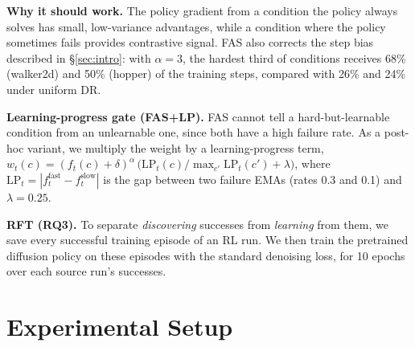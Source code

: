 \documentclass{article}
\newcommand{\fas}{\textsc{FAS}}
\begin{document}
\textbf{Why it should work.} The policy gradient from a condition the policy always solves has small, low-variance advantages, while a condition where the policy sometimes fails provides contrastive signal.
\fas{} also corrects the step bias described in \S\ref{sec:intro}: with $\alpha=3$, the hardest third of conditions receives 68\% (walker2d) and 50\% (hopper) of the training steps, compared with 26\% and 24\% under uniform DR.

\textbf{Learning-progress gate (\fas{}+LP).} \fas{} cannot tell a hard-but-learnable condition from an unlearnable one, since both have a high failure rate.
As a post-hoc variant, we multiply the weight by a learning-progress term, $w_t(c) = (f_t(c)+\delta)^\alpha\,\big(\mathrm{LP}_t(c)/\max_{c'}\mathrm{LP}_t(c') + \lambda\big)$, where $\mathrm{LP}_t = |f^{\text{fast}}_t - f^{\text{slow}}_t|$ is the gap between two failure EMAs (rates 0.3 and 0.1) and $\lambda=0.25$.

\textbf{RFT (RQ3).} To separate \emph{discovering} successes from \emph{learning} from them, we save every successful training episode of an RL run. We then train the pretrained diffusion policy on these episodes with the standard denoising loss, for 10 epochs over each source run's successes.

\section{Experimental Setup}
\label{sec:setup}
\end{document}

